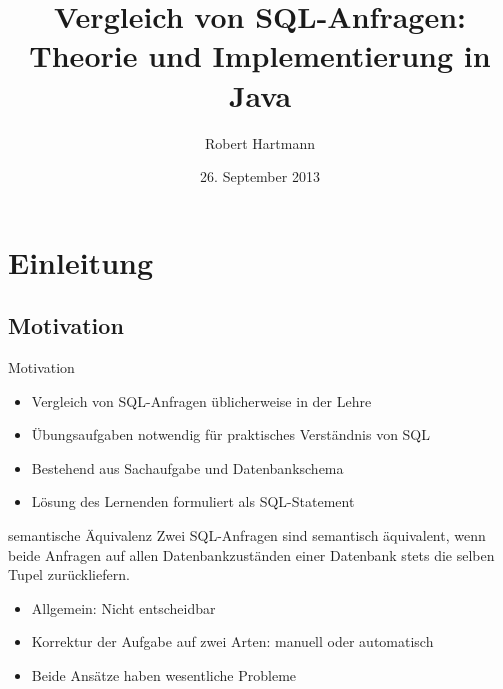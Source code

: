 \documentclass{beamer}
\title[Vergleich von SQL-Anfragen]{Vergleich von SQL-Anfragen:\\Theorie und Implementierung in Java}
\author[Robert Hartmann]{Robert Hartmann}
\institute[] %
{
  Martin-Luther-Universität Halle-Wittenberg\\
  Naturwissenschaftliche Fakultät III\\
  Institut für Informatik
}
\date[]{26. September 2013}
\begin{document}
\begin{frame}
  \titlepage
\end{frame}

\begin{frame}{}
  \tableofcontents
\end{frame}

\section{Einleitung}
\subsection{Motivation}

\begin{frame}{Motivation}
\begin{itemize}
\item Vergleich von SQL-Anfragen üblicherweise in der Lehre
\item Übungsaufgaben notwendig für praktisches Verständnis von SQL
\item Bestehend aus Sachaufgabe und Datenbankschema
\item Lösung des Lernenden formuliert als SQL-Statement
\end{itemize}

\begin{alertblock}{semantische Äquivalenz}
Zwei SQL-Anfragen sind semantisch äquivalent, wenn beide Anfragen auf allen Datenbankzuständen einer Datenbank stets die selben Tupel zurückliefern.
\end{alertblock}

\begin{itemize}
\item Allgemein: Nicht entscheidbar
\item Korrektur der Aufgabe auf zwei Arten: manuell oder automatisch
\item Beide Ansätze haben wesentliche Probleme
\end{itemize}

\end{frame}
\end{document}
